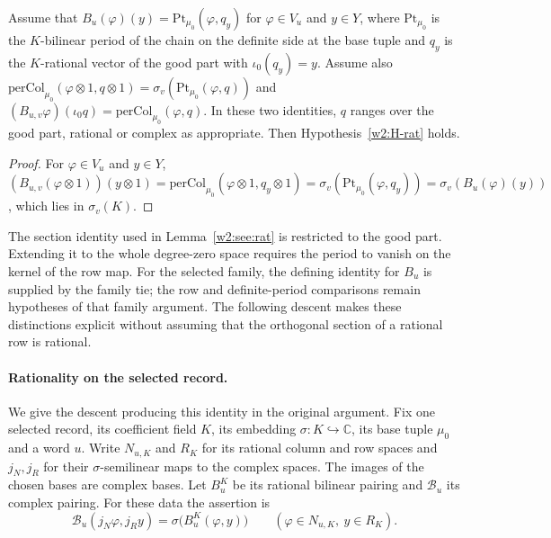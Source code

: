 \begin{lemma}[rationality]\label{w2:see:rat}
Assume that $B_u(\varphi)(y)=\mathrm{Pt}_{\mu_0}(\varphi,q_y)$ for $\varphi\in V_u$ and $y\in Y$, where $\mathrm{Pt}_{\mu_0}$ is the $K$-bilinear period of the chain on the definite side at the base tuple and $q_y$ is the $K$-rational vector of the good part with $\iota_0(q_y)=y$. Assume also $\mathrm{perCol}_{\mu_0}(\varphi\otimes1,q\otimes1)=\sigma_v(\mathrm{Pt}_{\mu_0}(\varphi,q))$ and $(B_{u,v}\varphi)(\iota_0q)=\mathrm{perCol}_{\mu_0}(\varphi,q)$. In these two identities, $q$ ranges over the good part, rational or complex as appropriate. Then Hypothesis~\ref{w2:H-rat} holds.
\end{lemma}

\begin{proof}
For $\varphi\in V_u$ and $y\in Y$, $(B_{u,v}(\varphi\otimes1))(y\otimes1)=\mathrm{perCol}_{\mu_0}(\varphi\otimes1,q_y\otimes1)=\sigma_v(\mathrm{Pt}_{\mu_0}(\varphi,q_y))=\sigma_v(B_u(\varphi)(y))$, which lies in $\sigma_v(K)$.
\end{proof}

The section identity used in Lemma~\ref{w2:see:rat} is restricted
to the good part. Extending it to the whole degree-zero space requires
the period to vanish on the kernel of the row map. For the selected
family, the defining identity for $B_u$ is supplied by the family tie;
the row and definite-period comparisons remain hypotheses of that
family argument. The following descent makes these distinctions
explicit without assuming that the orthogonal section of a rational
row is rational.

\paragraph{Rationality on the selected record.}\label{rat:selected}
We give the descent producing this identity in the original argument.
Fix one selected record, its coefficient field $K$, its embedding
$\sigma:K\hookrightarrow\mathbb C$, its base tuple $\mu_0$ and a word $u$.
Write $N_{u,K}$ and $R_K$ for its rational column and row spaces and
$j_N,j_R$ for their $\sigma$-semilinear maps to the complex spaces.
The images of the chosen bases are complex bases. Let $B^K_u$
be its rational bilinear pairing and $\mathcal B_u$ its complex pairing.
For these data the assertion is
\begin{equation}\label{rat:base}
 \mathcal B_u(j_N\varphi,j_R y)=\sigma\big(B^K_u(\varphi,y)\big)
 \qquad(\varphi\in N_{u,K},\ y\in R_K).
\end{equation}

